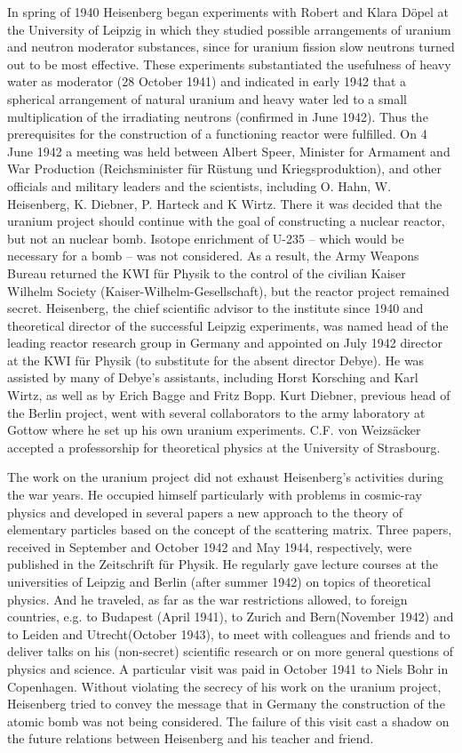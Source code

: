 \documentclass{article}
\begin{document}
In spring of 1940 Heisenberg began experiments with Robert and Klara Döpel at the University of Leipzig in which they studied possible arrangements of uranium and neutron moderator substances, since for uranium fission slow neutrons turned out to be most effective. These experiments substantiated the usefulness of heavy water as moderator (28 October 1941) and indicated in early 1942 that a spherical arrangement of natural uranium and heavy water led to a small multiplication of the irradiating neutrons (confirmed in June 1942). Thus the prerequisites for the construction of a functioning reactor were fulfilled. On 4 June 1942 a meeting was held between Albert Speer, Minister for Armament and War Production (Reichsminister für Rüstung und Kriegsproduktion), and other officials and military leaders and the scientists, including O. Hahn, W. Heisenberg, K. Diebner, P. Harteck and K Wirtz. There it was decided that the uranium project should continue with the goal of constructing a nuclear reactor, but not an nuclear bomb. Isotope enrichment of U-235 – which would be necessary for a bomb – was not considered. As a result, the Army Weapons Bureau returned the KWI für Physik to the control of the civilian Kaiser Wilhelm Society (Kaiser-Wilhelm-Gesellschaft), but the reactor project remained secret. Heisenberg, the chief scientific advisor to the institute since 1940 and theoretical director of the successful Leipzig experiments, was named head of the leading reactor research group in Germany and appointed on July 1942 director at the KWI für Physik (to substitute for the absent director Debye). He was assisted by many of Debye's assistants, including Horst Korsching and Karl Wirtz, as well as by Erich Bagge and Fritz Bopp. Kurt Diebner, previous head of the Berlin project, went with several collaborators to the army laboratory at Gottow where he set up his own uranium experiments. C.F. von Weizsäcker accepted a professorship for theoretical physics at the University of Strasbourg.

The work on the uranium project did not exhaust Heisenberg's activities during the war years. He occupied himself particularly with problems in cosmic-ray physics and developed in several papers a new approach to the theory of elementary particles based on the concept of the scattering matrix. Three papers, received in September and October 1942 and May 1944, respectively, were published in the Zeitschrift für Physik. He regularly gave lecture courses at the universities of Leipzig and Berlin (after summer 1942) on topics of theoretical physics. And he traveled, as far as the war restrictions allowed, to foreign countries, e.g. to Budapest (April 1941), to Zurich and Bern(November 1942) and to Leiden and Utrecht(October 1943), to meet with colleagues and friends and to deliver talks on his (non-secret) scientific research or on more general questions of physics and science. A particular visit was paid in October 1941 to Niels Bohr in Copenhagen. Without violating the secrecy of his work on the uranium project, Heisenberg tried to convey the message that in Germany the construction of the atomic bomb was not being considered. The failure of this visit cast a shadow on the future relations between Heisenberg and his teacher and friend.
\end{document}
